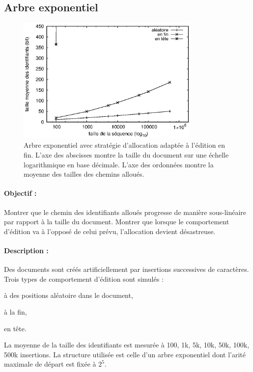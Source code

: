 \subsection{Arbre exponentiel}

\begin{figure}
  \centering
  \includegraphics[width=0.8\textwidth]{img/lseq/double.eps}
  \caption{\label{repl:img:exponentialtree} Arbre exponentiel avec stratégie
    d'allocation adaptée à l'édition en fin. L'axe des abscisses montre la
    taille du document sur une échelle logarithmique en base décimale. L'axe des
    ordonnées montre la moyenne des tailles des chemins alloués.}
\end{figure}

\paragraph{Objectif :} Montrer que le chemin des identifiants alloués progresse
de manière sous-linéaire par rapport à la taille du document. Montrer que
lorsque le comportement d'édition va à l'opposé de celui prévu, l'allocation
devient désastreuse.

\paragraph{Description :} Des documents sont créés artificiellement par
insertions successives de caractères. Trois types de comportement d'édition sont
simulés :
\begin{inparaenum}[(i)]
\item à des positions aléatoire dans le document,
\item à la fin,
\item en tête.
\end{inparaenum}
La moyenne de la taille des identifiants est mesurée à 100, 1k, 5k, 10k, 50k,
100k, 500k insertions. La structure utilisée est celle d'un arbre exponentiel
dont l'arité maximale de départ est fixée à $2^5$.

